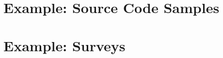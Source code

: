 \begin{appendices}
\chapter{Example: Source Code Samples}
\chapter{Example: Surveys}
\end{appendices}